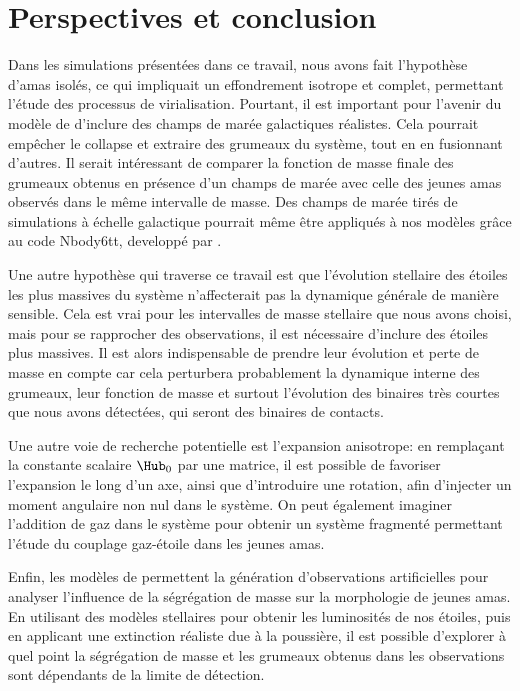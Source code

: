 \section{Perspectives et conclusion}

Dans les simulations pr\'esent\'ees dans ce travail, nous avons fait l'hypoth\`ese d'amas isol\'es, ce qui impliquait un effondrement isotrope et complet, permettant l'\'etude des processus de virialisation. Pourtant, il est important pour l'avenir du mod\`ele de \HubLem d'inclure des champs de mar\'ee galactiques r\'ealistes. Cela pourrait emp\^echer le collapse et extraire des grumeaux du syst\`eme, tout en en fusionnant d'autres. Il serait int\'eressant de comparer la fonction de masse finale des grumeaux obtenus en pr\'esence d'un champs de mar\'ee avec celle des jeunes amas observ\'es dans le m\^eme intervalle de masse. Des champs de mar\'ee tir\'es de simulations \`a \'echelle galactique pourrait m\^eme \^etre appliqu\'es \`a nos mod\`eles gr\^ace au code Nbody6tt, developp\'e par \cite{Renaud2011}.

Une autre hypoth\`ese qui traverse ce travail est que l'\'evolution stellaire des \'etoiles les plus massives du syst\`eme n'affecterait pas la dynamique g\'en\'erale de mani\`ere sensible. Cela est vrai pour les intervalles de masse stellaire que nous avons choisi, mais pour se rapprocher des observations, il est n\'ecessaire d'inclure des \'etoiles plus massives. Il est alors indispensable de prendre leur \'evolution et perte de masse en compte car cela perturbera probablement la dynamique interne des grumeaux, leur fonction de masse et surtout l'\'evolution des binaires tr\`es courtes que nous avons d\'etect\'ees, qui seront des binaires de contacts.

Une autre voie de recherche potentielle est l'expansion anisotrope: en rempla\c{c}ant la constante scalaire $\Hub_0$ par une matrice, il est possible de favoriser l'expansion le long d'un axe, ainsi que d'introduire une rotation, afin d'injecter un moment angulaire non nul dans le syst\`eme. On peut \'egalement imaginer l'addition de gaz dans le syst\`eme pour obtenir un syst\`eme fragment\'e permettant l'\'etude du couplage gaz-\'etoile dans les jeunes amas.

Enfin, les mod\`eles de \HubLem permettent la g\'en\'eration d'observations artificielles pour analyser l'influence de la s\'egr\'egation de masse sur la morphologie de jeunes amas. En utilisant des mod\`eles stellaires pour obtenir les luminosit\'es de nos \'etoiles, puis en applicant une extinction r\'ealiste due \`a la poussi\`ere, il est possible d'explorer \`a quel point la s\'egr\'egation de masse et les grumeaux obtenus dans les observations sont d\'ependants de la limite de d\'etection.



